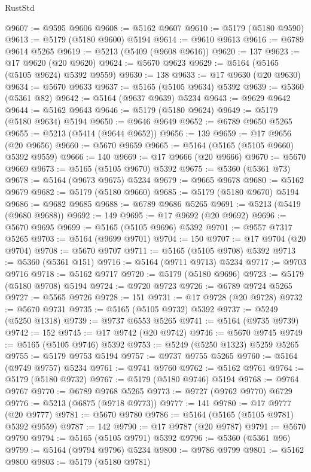 \begin{lexlean}{RustStd}
\begin{coremodule}
@9607 := @9595 @9606
@9608 := @5162 @9607
@9610 := @5179 (@5180 @9590)
@9613 := @5179 (@5180 @9600) @5194
@9614 := @9610 @9613
@9616 := @6789 @9614 @5265
@9619 := @5213 (@5409 (@9608 @9616))
@9620 := 137
@9623 := @17 @9620 (@20 @9620)
@9624 := @5670 @9623
@9629 := @5164 (@5165 (@5105 @9624) @5392 @9559)
@9630 := 138
@9633 := @17 @9630 (@20 @9630)
@9634 := @5670 @9633
@9637 := @5165 (@5105 @9634) @5392
@9639 := @5360 (@5361 @82)
@9642 := @5164 (@9637 @9639) @5234
@9643 := @9629 @9642
@9644 := @5162 @9643
@9646 := @5179 (@5180 @9624)
@9649 := @5179 (@5180 @9634) @5194
@9650 := @9646 @9649
@9652 := @6789 @9650 @5265
@9655 := @5213 (@5414 (@9644 @9652))
@9656 := 139
@9659 := @17 @9656 (@20 @9656)
@9660 := @5670 @9659
@9665 := @5164 (@5165 (@5105 @9660) @5392 @9559)
@9666 := 140
@9669 := @17 @9666 (@20 @9666)
@9670 := @5670 @9669
@9673 := @5165 (@5105 @9670) @5392
@9675 := @5360 (@5361 @73)
@9678 := @5164 (@9673 @9675) @5234
@9679 := @9665 @9678
@9680 := @5162 @9679
@9682 := @5179 (@5180 @9660)
@9685 := @5179 (@5180 @9670) @5194
@9686 := @9682 @9685
@9688 := @6789 @9686 @5265
@9691 := @5213 (@5419 (@9680 @9688))
@9692 := 149
@9695 := @17 @9692 (@20 @9692)
@9696 := @5670 @9695
@9699 := @5165 (@5105 @9696) @5392
@9701 := @9557 @7317 @5265
@9703 := @5164 (@9699 @9701)
@9704 := 150
@9707 := @17 @9704 (@20 @9704)
@9708 := @5670 @9707
@9711 := @5165 (@5105 @9708) @5392
@9713 := @5360 (@5361 @151)
@9716 := @5164 (@9711 @9713) @5234
@9717 := @9703 @9716
@9718 := @5162 @9717
@9720 := @5179 (@5180 @9696)
@9723 := @5179 (@5180 @9708) @5194
@9724 := @9720 @9723
@9726 := @6789 @9724 @5265
@9727 := @5565 @9726
@9728 := 151
@9731 := @17 @9728 (@20 @9728)
@9732 := @5670 @9731
@9735 := @5165 (@5105 @9732) @5392
@9737 := @5249 (@5250 @1318)
@9739 := @9737 @6553 @5265
@9741 := @5164 (@9735 @9739)
@9742 := 152
@9745 := @17 @9742 (@20 @9742)
@9746 := @5670 @9745
@9749 := @5165 (@5105 @9746) @5392
@9753 := @5249 (@5250 @1323) @5259 @5265
@9755 := @5179 @9753 @5194
@9757 := @9737 @9755 @5265
@9760 := @5164 (@9749 @9757) @5234
@9761 := @9741 @9760
@9762 := @5162 @9761
@9764 := @5179 (@5180 @9732)
@9767 := @5179 (@5180 @9746) @5194
@9768 := @9764 @9767
@9770 := @6789 @9768 @5265
@9773 := @9727 (@9762 @9770) @6729
@9776 := @5213 (@6875 (@9718 @9773))
@9777 := 141
@9780 := @17 @9777 (@20 @9777)
@9781 := @5670 @9780
@9786 := @5164 (@5165 (@5105 @9781) @5392 @9559)
@9787 := 142
@9790 := @17 @9787 (@20 @9787)
@9791 := @5670 @9790
@9794 := @5165 (@5105 @9791) @5392
@9796 := @5360 (@5361 @96)
@9799 := @5164 (@9794 @9796) @5234
@9800 := @9786 @9799
@9801 := @5162 @9800
@9803 := @5179 (@5180 @9781)

\end{coremodule}
\end{lexlean}
